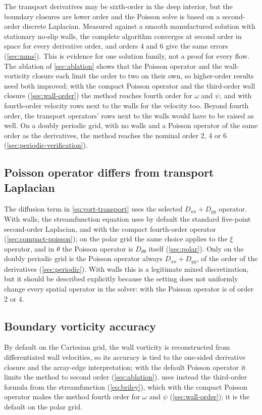 \documentclass[11pt,a4paper]{article}
\newcommand{\code}[1]{\texttt{\detokenize{#1}}}
\begin{document}
The transport derivatives may be sixth-order in the deep interior, but the boundary closures are lower order and the Poisson solve is based on a second-order discrete Laplacian.  Measured against a smooth manufactured solution with stationary no-slip walls, the complete algorithm converges at second order in space for every derivative order, and orders 4 and 6 give the same errors (\cref{sec:mms}).  This is evidence for one solution family, not a proof for every flow.  The ablation of \cref{sec:ablation} shows that the Poisson operator and the wall-vorticity closure each limit the order to two on their own, so higher-order results need both improved; with the compact Poisson operator and the third-order wall closure (\cref{sec:wall-order}) the method reaches fourth order for $\omega$ and $\psi$, and with fourth-order velocity rows next to the walls for the velocity too.  Beyond fourth order, the transport operators' rows next to the walls would have to be raised as well.  On a doubly periodic grid, with no walls and a Poisson operator of the same order as the derivatives, the method reaches the nominal order 2, 4 or 6 (\cref{sec:periodic-verification}).

\subsection{Poisson operator differs from transport Laplacian}

The diffusion term in \cref{eq:vort-transport} uses the selected $D_{xx}+D_{yy}$ operator.  With walls, the streamfunction equation uses by default the standard five-point second-order Laplacian, and with \code{--poisson-order 4} the compact fourth-order operator (\cref{sec:compact-poisson}); on the polar grid the same choice applies to the $\xi$ operator, and in $\theta$ the Poisson operator is $D_{\theta\theta}$ itself (\cref{sec:polar}).  Only on the doubly periodic grid is the Poisson operator always $D_{xx}+D_{yy}$, of the order of the derivatives (\cref{sec:periodic}).  With walls this is a legitimate mixed discretization, but it should be described explicitly because the \code{order} setting does not uniformly change every spatial operator in the solver: with \code{--order 6} the Poisson operator is of order 2 or 4.

\subsection{Boundary vorticity accuracy}

By default on the Cartesian grid, the wall vorticity is reconstructed from differentiated wall velocities, so its accuracy is tied to the one-sided derivative closure and the array-edge interpretation; with the default Poisson operator it limits the method to second order (\cref{sec:ablation}).  \code{--wall-closure briley} uses instead the third-order formula from the streamfunction (\cref{eq:briley}), which with the compact Poisson operator makes the method fourth order for $\omega$ and $\psi$ (\cref{sec:wall-order}); it is the default on the polar grid.
\end{document}
